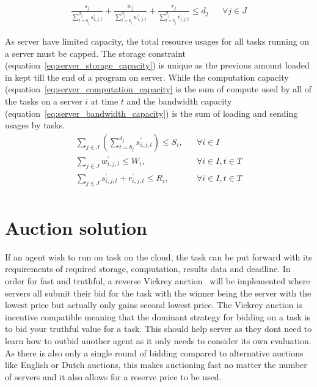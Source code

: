 \begin{align}
    \frac{s_j}{\sum^{d_j}_{t=b_j} s^{'}_{i,j,t}} + \frac{w_j}{\sum^{d_j}_{t=b_j} w^{'}_{i,j,t}}  +
    \frac{r_j}{\sum^{d_j}_{t=b_j} r^{'}_{i,j,t}} \leq d_j && \forall{j \in J}  \label{eq:deadline}
\end{align}

As server have limited capacity, the total resource usages for all tasks running on a server must be capped.
The storage constraint (equation~\eqref{eq:server_storage_capacity}) is unique as the previous amount
loaded in kept till the end of a program on server. While the computation capacity
(equation~\eqref{eq:server_computation_capacity} is the sum of compute used by all of the tasks on a server $i$ at time $t$ and the
bandwidth capacity (equation~\eqref{eq:server_bandwidth_capacity}) is the sum of loading and sending usages by tasks.
\begin{align}
    \sum_{j \in J} \left(\sum^{d_j}_{t=b_j} s^{'}_{i,j,t} \right) \leq S_i, && \forall{i \in I} \label{eq:server_storage_capacity} \\
    \sum_{j \in J} w^{'}_{i,j,t} \leq W_i, && \forall{i \in I, t \in T} \label{eq:server_computation_capacity} \\
    \sum_{j \in J} s^{'}_{i,j,t} + r^{'}_{i,j,t} \leq R_i, && \forall{i \in I, t \in T} \label{eq:server_bandwidth_capacity} \\
\end{align}

\section{Auction solution}\label{sec:auction_solution}
If an agent wish to run on task on the cloud, the task can be put forward with its requirements of required storage,
computation, results data and deadline. In order for fast and truthful, a reverse Vickrey auction~\citep{vickrey}
will be implemented  where servers all submit their bid for the task with the winner being the server with the lowest
price but actually only gains second lowest price. The Vickrey auction is incentive compatible meaning that the dominant
strategy for bidding on a task is to bid your truthful value for a task. This should help server as they dont need
to learn how to outbid another agent as it only needs to consider its own evaluation.
As there is also only a single round of bidding compared to alternative auctions like English or Dutch
auctions, this makes auctioning fast no matter the number of servers and it also allows for a reserve price to be used.

